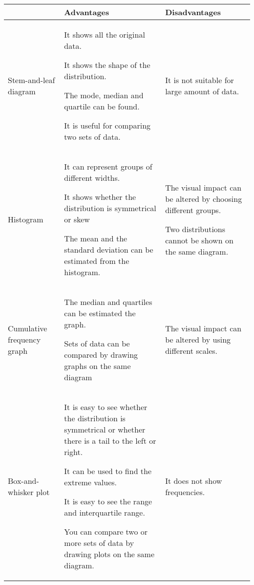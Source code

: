 \begin{table}[!htpb]
	\begin{tabular}{|l|p{5cm}|p{5cm}|}
		\hline
		& \textbf{Advantages} & \textbf{Disadvantages} \\ \hline
		
		
		Stem-and-leaf diagram   &  It shows all the original data.
		
		It shows the shape of the distribution.
		
		The mode, median and quartile can be found.
		
		It is useful for comparing two sets of data.
	
		&  It is not suitable for large amount of data.
		\\ \hline
		
		
		Histogram &     It can represent groups of different widths.
		
		It shows whether the distribution is symmetrical or skew
		
		The mean and the standard deviation can be estimated from the histogram.       &   The visual impact can be altered by choosing different groups.
		
		Two distributions cannot be shown on the same diagram.           \\ \hline
		
		
		Cumulative frequency graph   &      The median and quartiles can be estimated the graph.  
		
		Sets of data can be compared by drawing graphs on the same diagram
		&    The visual impact can be altered by using different scales.           \\ \hline
		
		Box-and-whisker plot   &      It is easy to see whether the distribution is symmetrical or whether  there is a tail to the left or right.
		
		It can be used to find the extreme values.
		
		It is easy to see the range and interquartile range.
		
		You can compare two or more sets of data by drawing plots on the same diagram.
		&    It does not show frequencies.           \\ \hline
	\end{tabular}
\end{table}


\newpage


